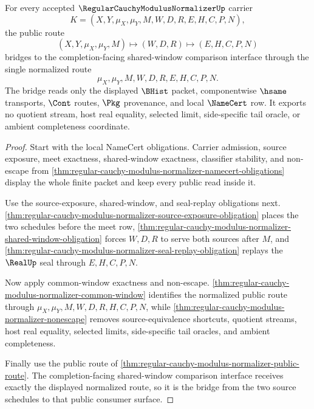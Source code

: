 \begin{theorem}
\label{thm:regular-cauchy-modulus-normalizer-normalized-route-bridge}
For every accepted $\RegularCauchyModulusNormalizerUp$ carrier
$$
K=(X,Y,\mu_X,\mu_Y,M,W,D,R,E,H,C,P,N),
$$
the public route
$$
(X,Y,\mu_X,\mu_Y,M)\mapsto(W,D,R)\mapsto(E,H,C,P,N)
$$
bridges to the completion-facing shared-window comparison interface through the single normalized route
$$
\mu_X,\mu_Y,M,W,D,R,E,H,C,P,N .
$$
The bridge reads only the displayed $\BHist$ packet, componentwise $\hsame$ transports, $\Cont$ routes, $\Pkg$ provenance, and local $\NameCert$ row. It exports no quotient stream, host real equality, selected limit, side-specific tail oracle, or ambient completeness coordinate.
\end{theorem}
\begin{proof}
Start with the local NameCert obligations. Carrier admission, source exposure,
meet exactness, shared-window exactness, classifier stability, and non-escape
from \autoref{thm:regular-cauchy-modulus-normalizer-namecert-obligations}
display the whole finite packet and keep every public read inside it.

Use the source-exposure, shared-window, and seal-replay obligations next.
\autoref{thm:regular-cauchy-modulus-normalizer-source-exposure-obligation}
places the two schedules before the meet row,
\autoref{thm:regular-cauchy-modulus-normalizer-shared-window-obligation}
forces $W,D,R$ to serve both sources after $M$, and
\autoref{thm:regular-cauchy-modulus-normalizer-seal-replay-obligation}
replays the $\RealUp$ seal through $E,H,C,P,N$.

Now apply common-window exactness and non-escape.
\autoref{thm:regular-cauchy-modulus-normalizer-common-window} identifies the
normalized public route through $\mu_X,\mu_Y,M,W,D,R,H,C,P,N$, while
\autoref{thm:regular-cauchy-modulus-normalizer-nonescape} removes
source-equivalence shortcuts, quotient streams, host real equality, selected
limits, side-specific tail oracles, and ambient completeness.

Finally use the public route of
\autoref{thm:regular-cauchy-modulus-normalizer-public-route}. The completion-facing
shared-window comparison interface receives exactly the displayed normalized
route, so it is the bridge from the two source schedules to that public
consumer surface.
\end{proof}

